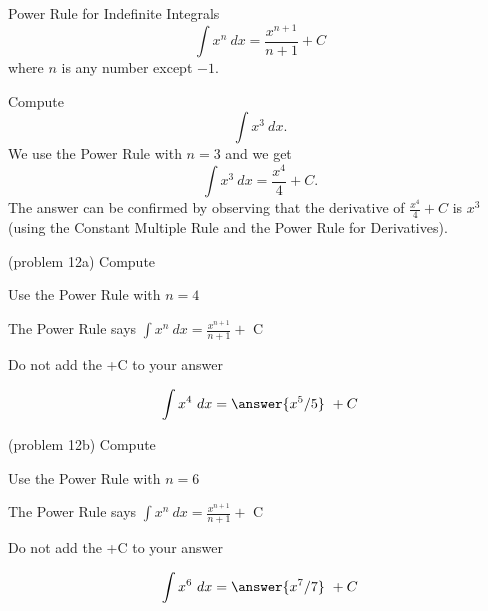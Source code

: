 \documentclass[handout]{ximera}
\begin{document}
\begin{theorem} Power Rule for Indefinite Integrals
\[
\int x^n \ dx = \frac{x^{n+1}}{n+1} +C 
\]
where $n$ is any number except $-1$.
\end{theorem}




\begin{example}[example 12]
Compute $$\int x^3 \ dx.$$
We use the Power Rule with $n= 3$ and we get
\[\int x^3 \ dx = \frac{x^4}{4} + C.\]  The answer can be confirmed by observing that the 
derivative of $\frac{x^4}{4} +C$ is $x^3$ (using the Constant Multiple Rule and the Power Rule for Derivatives).
\end{example}

\begin{problem}(problem 12a)
Compute 

\begin{hint}
Use the Power Rule with $n=4$
\end{hint}
\begin{hint}
The Power Rule says $\int x^n \ dx = \frac{x^{n+1}}{n+1} +$ C
\end{hint}
\begin{hint}
\begin{center}
Do not add the +C to your answer
\end{center}
\end{hint}

\[
\int x^4 \ dx =
\answer{x^5 /5} \ + C
\]
\end{problem}


\begin{problem}(problem 12b)
Compute 

\begin{hint}
Use the Power Rule with $n=6$
\end{hint}
\begin{hint}
The Power Rule says $\int x^n \ dx = \frac{x^{n+1}}{n+1} +$ C
\end{hint}
\begin{hint}
\begin{center}
Do not add the +C to your answer
\end{center}
\end{hint}

\[
\int x^6 \ dx =
\answer{x^7 /7} \ + C
\]
\end{problem}
\end{document}

